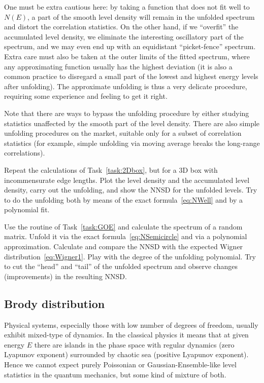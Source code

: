 \documentclass[a4paper,11pt,twoside]{article}
\begin{document}
\begin{enumerate}
                One must be extra cautious here: by taking a function that does not fit well to $N(E)$, a part of the smooth level density will remain in the unfolded spectrum and distort the correlation statistics.
                On the other hand, if we ``overfit'' the accumulated level density, we eliminate the interesting oscillatory part of the spectrum, and we may even end up with an equidistant ``picket-fence'' spectrum.
                Extra care must also be taken at the outer limits of the fitted spectrum, where any approximating function usually has the highest deviation (it is also a common practice to disregard a small part of the lowest and highest energy levels after unfolding).
                The approximate unfolding is thus a very delicate procedure, requiring some experience and feeling to get it right.  

                Note that there are ways to bypass the unfolding procedure by either studying statistics unaffected by the smooth part of the level density.
                There are also simple unfolding procedures on the market, suitable only for a subset of correlation statistics (for example, simple unfolding via moving average breaks the long-range correlations).
        \end{enumerate}

        \begin{task}
            Repeat the calculations of Task~\ref{task:2Dbox}, but for a 3D box with incommensurate edge lengths.
            Plot the level density and the accumulated level density, carry out the unfolding, and show the NNSD for the unfolded levels.
            Try to do the unfolding both by means of the exact formula~\eqref{eq:NWell} and by a polynomial fit.
        \end{task}

        \begin{task}\label{task:GOE}
            Use the routine of Task~\ref{task:GOE} and calculate the spectrum of a random matrix.
            Unfold it via the exact formula~\eqref{eq:NSemicircle} and via a polynomial approximation.
            Calculate and compare the NNSD with the expected Wigner distribution~\eqref{eq:Wigner1}.
            Play with the degree of the unfolding polynomial.
            Try to cut the ``head'' and ``tail'' of the unfolded spectrum and observe changes (improvements) in the resulting NNSD. 
        \end{task}

    \subsection{Brody distribution}
        Physical systems, especially those with low number of degrees of freedom, usually exhibit mixed-type of dynamics.
        In the classical physics it means that at given energy $E$ there are islands in the phase space with regular dynamics (zero Lyapunov exponent) surrounded by chaotic sea (positive Lyapunov exponent).
        Hence we cannot expect purely Poissonian or Gaussian-Ensemble-like level statistics in the quantum mechanics, but some kind of mixture of both.
\end{document}
